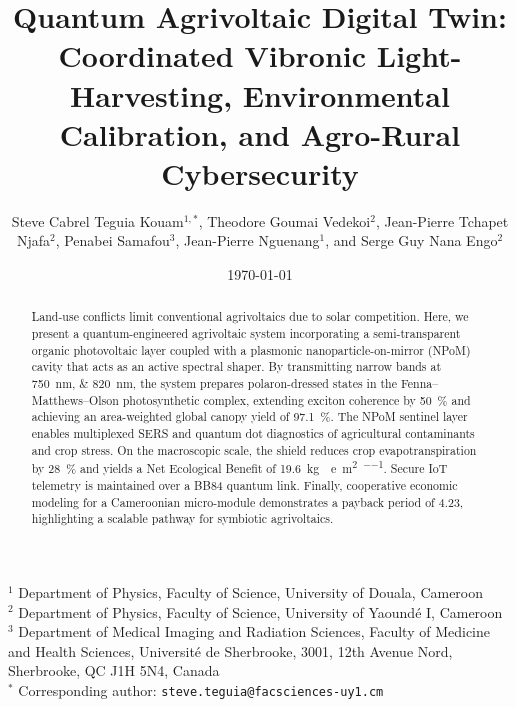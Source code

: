 \documentclass[onecolumn,a4paper,12pt]{article}
\title{Quantum Agrivoltaic Digital Twin: Coordinated Vibronic Light-Harvesting, Environmental Calibration, and Agro-Rural Cybersecurity}
\author{Steve Cabrel Teguia Kouam$^{1,*}$,
        Theodore Goumai Vedekoi$^{2}$,
        Jean-Pierre Tchapet Njafa$^{2}$,
        Penabei Samafou$^{3}$,
        Jean-Pierre Nguenang$^{1}$,
        and Serge Guy Nana Engo$^{2}$}
\date{\today}
\begin{document}
\maketitle

\begin{center}
\small
$^{1}$ Department of Physics, Faculty of Science, University of Douala, Cameroon\\
$^{2}$ Department of Physics, Faculty of Science, University of Yaound\'{e} I, Cameroon\\
$^{3}$ Department of Medical Imaging and Radiation Sciences, Faculty of Medicine and Health Sciences, Université de Sherbrooke, 3001, 12th Avenue Nord, Sherbrooke, QC J1H 5N4, Canada\\
$^{*}$ Corresponding author: \texttt{steve.teguia@facsciences-uy1.cm}
\end{center}


\begin{abstract}
Land-use conflicts limit conventional agrivoltaics due to solar competition. Here, we present a quantum-engineered agrivoltaic system incorporating a semi-transparent organic photovoltaic layer coupled with a plasmonic nanoparticle-on-mirror (NPoM) cavity that acts as an active spectral shaper. By transmitting narrow bands at \qtylist{750;820}{\nm}, the system prepares polaron-dressed states in the Fenna--Matthews--Olson photosynthetic complex, extending exciton coherence by \qty{50}{\percent} and achieving an area-weighted global canopy yield of \qty{97.1}{\percent}. The NPoM sentinel layer enables multiplexed SERS and quantum dot diagnostics of agricultural contaminants and crop stress. On the macroscopic scale, the shield reduces crop evapotranspiration by \qty{28}{\percent} and yields a Net Ecological Benefit of \qty{19.6}{\kg{}e\per\m\squared\per\yr}. Secure IoT telemetry is maintained over a BB84 quantum link. Finally, cooperative economic modeling for a Cameroonian micro-module demonstrates a payback period of \qty{4.23}{\yr}, highlighting a scalable pathway for symbiotic agrivoltaics.
\end{abstract}

\end{document}
